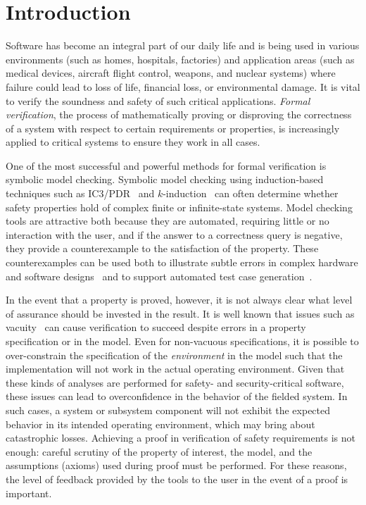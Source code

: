 \chapter{Introduction}
\label{ch:intro}
Software has become an integral part of our daily life and is being used in various environments (such as homes, hospitals, factories) and application areas (such as medical devices, aircraft flight control, weapons, and nuclear systems) where failure could lead to loss of life, financial loss, or environmental damage. It is vital to verify the soundness and safety of such critical applications. \emph{Formal verification}, the process of mathematically proving or disproving the correctness of a system with respect to certain requirements or properties, is increasingly applied to critical systems to ensure they work in all cases.

One of the most successful and powerful methods for formal verification is symbolic model checking. Symbolic model checking using induction-based techniques such as IC3/PDR~\cite{Een2011:PDR} and $k$-induction~\cite{SheeranSS00} can often determine whether safety properties hold of complex finite or infinite-state systems.  Model checking tools are attractive both because they are automated, requiring little or no interaction with the user, and if the answer to a correctness query is negative, they provide a counterexample to the satisfaction of the property.  These counterexamples can be used both to illustrate subtle errors in complex hardware and software designs~\cite{hilt2013,McMillan99:compositional, Miller10:CACM} and to support automated test case generation~\cite{Whalen13:OMCDC, You15:dse}.

In the event that a property is proved, however, it is not always clear what level of assurance should be invested in the result. It is well known that issues such as vacuity~\cite{Kupferman03:Vacuity} can cause verification to succeed despite errors in a property specification or in the model.
Even for non-vacuous specifications, it is possible to over-constrain the specification of the {\em environment} in the model such that the implementation will not work in the actual operating environment.
Given that these kinds of analyses are performed for safety- and security-critical software, these issues can lead to overconfidence in the behavior of the fielded system.
In such cases, a system or subsystem component will not exhibit the expected behavior in its intended operating environment, which may bring about catastrophic losses. Achieving a proof in verification of safety requirements is not enough: careful scrutiny of the property of interest, the model, and the assumptions (axioms) used during proof must be performed.  For these reasons, the level of feedback provided by the tools to the user in the event of a proof is important.

